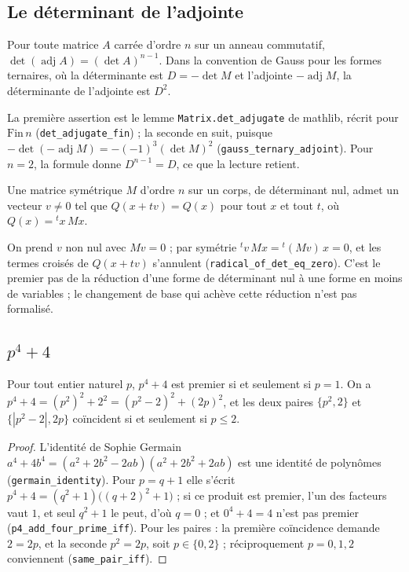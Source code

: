 \subsection*{Le déterminant de l'adjointe}

\begin{enonce}
Pour toute matrice $A$ carrée d'ordre $n$ sur un anneau commutatif, $\det(\operatorname{adj} A) = (\det A)^{n-1}$. Dans la convention de Gauss pour les formes ternaires, où la déterminante est $D = -\det M$ et l'adjointe $-\operatorname{adj} M$, la déterminante de l'adjointe est $D^2$.
\end{enonce}

La première assertion est le lemme \texttt{Matrix.det\_adjugate} de mathlib, récrit pour $\mathrm{Fin}\,n$ (\texttt{det\_adjugate\_fin}) ; la seconde en suit, puisque $-\det(-\operatorname{adj} M) = -(-1)^3 (\det M)^2$ (\texttt{gauss\_ternary\_adjoint}). Pour $n = 2$, la formule donne $D^{n-1} = D$, ce que la lecture retient.

\begin{enonce}
Une matrice symétrique $M$ d'ordre $n$ sur un corps, de déterminant nul, admet un vecteur $v \neq 0$ tel que $Q(x + tv) = Q(x)$ pour tout $x$ et tout $t$, où $Q(x) = {}^tx\,M x$.
\end{enonce}

On prend $v$ non nul avec $Mv = 0$ ; par symétrie ${}^tv\,M x = {}^t(Mv)\,x = 0$, et les termes croisés de $Q(x + tv)$ s'annulent (\texttt{radical\_of\_det\_eq\_zero}). C'est le premier pas de la réduction d'une forme de déterminant nul à une forme en moins de variables ; le changement de base qui achève cette réduction n'est pas formalisé.

\subsection*{$p^4 + 4$}

\begin{enonce}
Pour tout entier naturel $p$, $p^4 + 4$ est premier si et seulement si $p = 1$. On a $p^4 + 4 = (p^2)^2 + 2^2 = (p^2 - 2)^2 + (2p)^2$, et les deux paires $\{p^2, 2\}$ et $\{|p^2 - 2|, 2p\}$ coïncident si et seulement si $p \leq 2$.
\end{enonce}

\begin{proof}
L'identité de Sophie Germain $a^4 + 4b^4 = (a^2 + 2b^2 - 2ab)(a^2 + 2b^2 + 2ab)$ est une identité de polynômes (\texttt{germain\_identity}). Pour $p = q + 1$ elle s'écrit $p^4 + 4 = (q^2 + 1)\big((q+2)^2 + 1\big)$ ; si ce produit est premier, l'un des facteurs vaut $1$, et seul $q^2 + 1$ le peut, d'où $q = 0$ ; et $0^4 + 4 = 4$ n'est pas premier (\texttt{p4\_add\_four\_prime\_iff}). Pour les paires : la première coïncidence demande $2 = 2p$, et la seconde $p^2 = 2p$, soit $p \in \{0, 2\}$ ; réciproquement $p = 0, 1, 2$ conviennent (\texttt{same\_pair\_iff}).
\end{proof}

